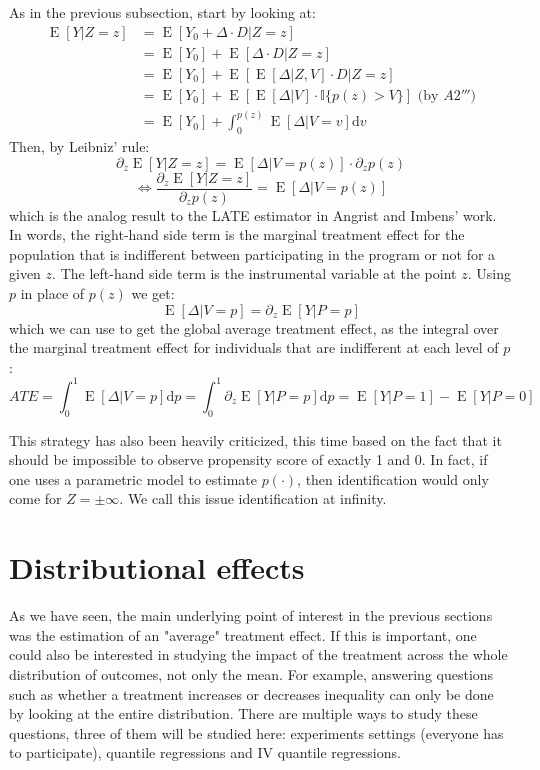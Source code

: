 \documentclass[12pt]{report}
\def\D{\mathrm{d}}
\newcommand{\E}[1]{\operatorname{E}\left[#1\right]}
\def\D{\mathrm{d}}
\def\D{\mathrm{d}}
\begin{document}
As in the previous subsection, start by looking at: \begin{align*}
\E{Y\vert Z=z} & = \E{Y_0 + \Delta\cdot D \vert Z = z} \\
& = \E{Y_0} + \E{\Delta\cdot D \vert Z = z} \\ 
& = \E{Y_0} + \E{\E{\Delta\vert Z, V} \cdot D \vert Z = z} \\
& = \E{Y_0} + \E{\E{\Delta\vert V} \cdot \mathbb{I}\{p(z)>V\}} \text{ (by } A2''') \\ 
& = \E{Y_0} + \int_0^{p(z)}\E{\Delta\vert V=v} \D v 
\end{align*} 
Then, by Leibniz' rule: $$\partial_z \E{Y\vert Z=z} = \E{\Delta\vert V=p(z)}\cdot \partial_zp(z) $$ $$\Leftrightarrow \frac{\partial_z \E{Y\vert Z=z}}{\partial_zp(z)} = \E{\Delta\vert V=p(z)} $$ which is the analog result to the LATE estimator in Angrist and Imbens' work. In words, the right-hand side term is the marginal treatment effect for the population that is indifferent between participating in the program or not for a given $z$. The left-hand side term is the instrumental variable at the point $z$. Using $p$ in place of $p(z)$ we get: $$ \E{\Delta\vert V=p} = \partial_z \E{Y\vert P=p}$$ which we can use to get the global average treatment effect, as the integral over the marginal treatment effect for individuals that are indifferent at each level of $p$: $$ATE = \int_0^1 \E{\Delta\vert V=p}\D p = \int_0^1 \partial_z \E{Y\vert P=p}\D p = \E{Y\vert P=1} - \E{Y\vert P=0} $$

This strategy has also been heavily criticized, this time based on the fact that it should be impossible to observe propensity score of exactly 1 and 0. In fact, if one uses a parametric model to estimate $p(\cdot)$, then identification would only come for $Z=\pm \infty$. We call this issue identification at infinity.

\section{Distributional effects}

As we have seen, the main underlying point of interest in the previous sections was the estimation of an "average" treatment effect. If this is important, one could also be interested in studying the impact of the treatment across the whole distribution of outcomes, not only the mean. For example, answering questions such as whether a treatment increases or decreases inequality can only be done by looking at the entire distribution. There are multiple ways to study these questions, three of them will be studied here: experiments settings (everyone has to participate), quantile regressions and IV quantile regressions.
\end{document}
